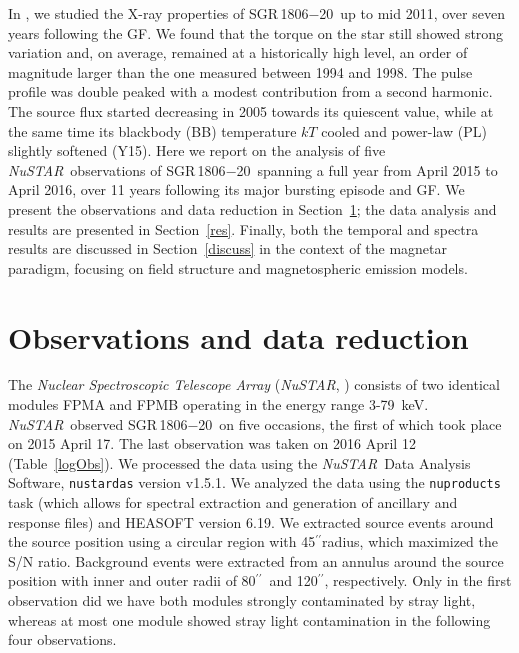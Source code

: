 \documentclass[twocolumn]{aastex6}
\newcommand {\nustar} {\textsl{NuSTAR}}
\def \arcsec {\hbox{$^{\prime\prime}$}}
\def \src {SGR\,1806$-$20}
\begin{document}
In \citet[][Y15 hereinafter]{younes15ApJ:1806}, we studied the X-ray
properties of \src\ up to mid 2011, over seven years following the
GF. We found that the torque on the star still showed strong variation
and, on average, remained at a historically high level, an order of
magnitude larger than the one measured between 1994 and 1998. The
pulse profile was double peaked with a modest contribution from a
second harmonic. The source flux started decreasing in 2005 towards its
quiescent value, while at the same time its blackbody (BB)
temperature $kT$ cooled and power-law (PL) slightly softened
(Y15). Here we report on the analysis of five \nustar\ observations of
\src\ spanning a full year from April 2015 to April 2016, over 11
years following its major bursting episode and GF. We present the
observations and data reduction in Section~\ref{obs}; the data
analysis and results are presented in Section~\ref{res}. Finally, 
both the temporal and spectra results are discussed in Section~\ref{discuss}
in the context of the magnetar paradigm, focusing on field structure 
and magnetospheric emission models.

\section{Observations and data reduction}
\label{obs}

The {\it Nuclear Spectroscopic Telescope Array} (\nustar, \citealt{
  harrison13ApJ:NuSTAR}) consists of two identical modules FPMA and
FPMB operating in the energy range 3-79~keV. \nustar\ observed \src\
on five occasions, the first of which took place on 2015 April 17. The
last observation was taken on 2016 April 12 (Table~\ref{logObs}). We
processed the data using the \nustar\ Data Analysis Software,
\texttt{nustardas} version v1.5.1. We analyzed the data using the
\texttt{nuproducts} task (which allows for spectral extraction and
generation of ancillary and response files) and HEASOFT version
6.19. We extracted source events around the source position using a
circular region with 45\arcsec radius, which maximized the S/N
ratio. Background events were extracted from an annulus around the
source position with inner and outer radii of 80\arcsec\ and
120\arcsec, respectively. Only in the first observation did we have
both modules strongly contaminated by stray light, whereas at most one
module showed stray light contamination in the following four
observations.
\end{document}
